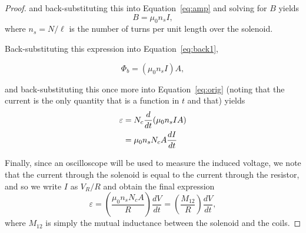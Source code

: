 \documentclass[twocolumn,english]{IEEEtran}
\theoremstyle{plain}
\theoremstyle{plain}
\begin{document}
\begin{proof}
and back-substituting this into Equation~\ref{eq:amp} and solving for $B$ yields
\begin{equation}
	B = \mu_0 n_s I,
\end{equation}
where $n_s = N/\ell$ is the number of turns per unit length over the solenoid.

Back-substituting this expression into Equation~\ref{eq:back1},

\begin{equation}
	\Phi_b = (\mu_0 n_s I)A,
\end{equation}

and back-substituting this once more into Equation~\ref{eq:orig} (noting that the current is the only quantity that is a function in $t$ and that) yields
\begin{align}
	\varepsilon &= N_c \frac{d}{dt}(\mu_0 n_s IA) \notag \\
	&= \mu_0 n_s N_c A \frac{dI}{dt}
\end{align}

Finally, since an oscilloscope will be used to measure the induced voltage, we note that the current through the solenoid is equal to the current through the resistor, and so we write $I$ as $V_R/R$ and obtain the final expression
\begin{equation}\label{eq:final}
	\varepsilon = \left(\frac{\mu_0 n_s N_c A}{R}\right) \frac{dV}{dt} = \left( \frac{M_{12}}{R} \right) \frac{dV}{dt},
\end{equation}
where $M_{12}$ is simply the mutual inductance between the solenoid and the coils.
\end{proof}
\end{document}
